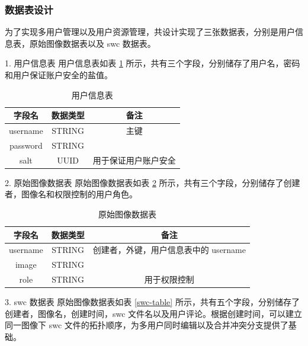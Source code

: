 \subsubsection{数据表设计}
为了实现多用户管理以及用户资源管理，共设计实现了三张数据表，分别是用户信息表，原始图像数据表以及 swc 数据表。

1. 用户信息表
用户信息表如表 \ref{user-table} 所示，共有三个字段，分别储存了用户名，密码和用户保证账户安全的盐值。
\begin{table}
\centering
\caption{用户信息表}
\begin{tabular}{|c|c|c|}
			   \hline
                 字段名 & 数据类型 & 备注 \\
               \hline
                 username & STRING & 主键 \\
               \hline
                 password & STRING &  \\
               \hline
                 salt & UUID & 用于保证用户账户安全 \\
               \hline
             \end{tabular}
             \label{user-table}    
\end{table}

2. 原始图像数据表
原始图像数据表如表 \ref{image-table} 所示，共有三个字段，分别储存了创建者，图像名和权限控制的用户角色。

\begin{table}
\centering
\caption{原始图像数据表}
\begin{tabular}{|c|c|c|}
			   \hline
                 字段名 & 数据类型 & 备注 \\
               \hline
                 username & STRING & 创建者，外键，用户信息表中的 username \\
               \hline
                 image & STRING &  \\
               \hline
                 role & STRING & 用于权限控制 \\
               \hline
             \end{tabular}
             \label{image-table}    
\end{table}

3. swc 数据表
原始图像数据表如表 \ref{swc-table} 所示，共有五个字段，分别储存了创建者，图像名，创建时间，swc 文件名以及用户评论。根据创建时间，可以建立同一图像下 swc 文件的拓扑顺序，为多用户同时编辑以及合并冲突分支提供了基础。

